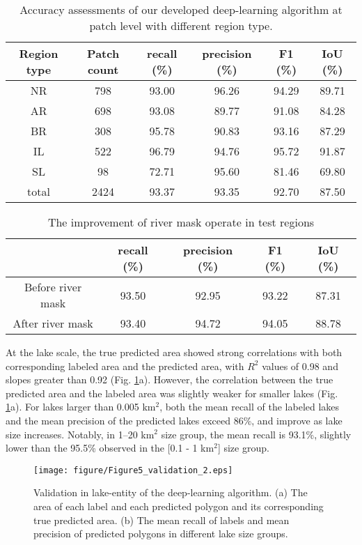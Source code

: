 \documentclass[preprint,12pt,authoryear]{elsarticle}
\begin{document}
\begin{table}[t]
    \centering
    \caption{Accuracy assessments of our developed deep-learning algorithm at patch level with different region type.}\label{tabel1}
    \begin{tabular}{cccccc}
    \toprule
    Region type & Patch count & recall (\%)	& precision (\%) & F1 (\%) & IoU (\%) \\
    \midrule
    NR & 798 & 93.00 & 96.26 & 94.29 & 89.71 \\
    AR & 698 & 93.08 & 89.77 & 91.08 & 84.28 \\
    BR & 308 & 95.78 & 90.83 & 93.16 & 87.29 \\
    IL & 522 & 96.79 & 94.76 & 95.72 & 91.87 \\
    SL & 98 & 72.71 & 95.60 & 81.46 & 69.80 \\
    total & 2424 & 93.37 & 93.35 & 92.70 & 87.50 \\
    \bottomrule
    \end{tabular}
    
\end{table}

\begin{table}[t]
    \centering
    \caption{The improvement of river mask operate in test regions}\label{tabel2}
    \begin{tabular}{ccccc}
    \toprule
     & recall (\%)	& precision (\%) & F1 (\%) & IoU (\%) \\
    \midrule
    Before river mask & 93.50  & 92.95  & 93.22  & 87.31 \\
    After river mask & 93.40  & 94.72  & 94.05  & 88.78 \\
    \bottomrule
    \end{tabular}
\end{table}

At the lake scale, the true predicted area showed strong correlations with both corresponding labeled area and the predicted area, with $R^2$ values of 0.98 and slopes greater than 0.92 (Fig. \ref{fig:Fig5}a). However, the correlation between the true predicted area and the labeled area was slightly weaker for smaller lakes (Fig. \ref{fig:Fig5}a). For lakes larger than 0.005 km$^2$, both the mean recall of the labeled lakes and the mean precision of the predicted lakes exceed 86\%, and improve as lake size increases. Notably, in 1–20 km$^2$ size group, the mean recall is 93.1\%, slightly lower than the 95.5\% observed in the [0.1 - 1 km$^2$] size group.

\begin{figure}[h]
    \centering
    \texttt{[image: figure/Figure5\_validation\_2.eps]}
    \caption{Validation in lake-entity of the deep-learning algorithm. (a) The area of each label and each predicted polygon and its corresponding true predicted area. (b) The mean recall of labels and mean precision of predicted polygons in different lake size groups.}
    \label{fig:Fig5}
\end{figure}
\end{document}
